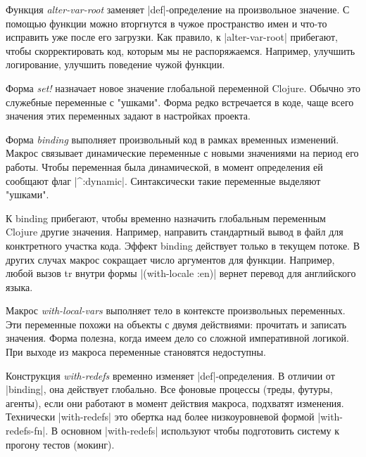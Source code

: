 Функция \emph{alter-var-root} заменяет \spverb|def|-определение на произвольное значение. С
помощью функции можно вторгнутся в чужое пространство имен и что-то исправить
уже после его загрузки. Как правило, к \spverb|alter-var-root| прибегают, чтобы
скорректировать код, которым мы не распоряжаемся. Например, улучшить
логирование, улучшить поведение чужой функции.

Форма \emph{set!} назначает новое значение глобальной переменной Clojure. Обычно
это служебные переменные с "ушками". Форма редко встречается в коде, чаще всего
значения этих переменных задают в настройках проекта.

Форма \emph{binding} выполняет произвольный код в рамках временных
изменений. Макрос связывает динамические переменные с новыми значениями на
период его работы. Чтобы переменная была динамической, в момент определения ей
сообщают флаг \spverb|^:dynamic|. Синтаксически такие переменные выделяют "ушками".

К binding прибегают, чтобы временно назначить глобальным переменным Clojure
другие значения. Например, направить стандартный вывод в файл для конктретного
участка кода. Эффект binding действует только в текущем потоке. В других случах
макрос сокращает число аргументов для функции. Например, любой вызов tr внутри
формы \spverb|(with-locale :en)| вернет перевод для английского языка.

Макрос \emph{with-local-vars} выполняет тело в контексте произвольных
переменных. Эти переменные похожи на объекты с двумя действиями: прочитать и
записать значения. Форма полезна, когда имеем дело со сложной императивной
логикой. При выходе из макроса переменные становятся недоступны.

Конструкция \emph{with-redefs} временно изменяет \spverb|def|-определения. В отличии от
\spverb|binding|, она действует глобально. Все фоновые процессы (треды, футуры,
агенты), если они работают в момент действия макроса, подхватят
изменения. Технически \spverb|with-redefs| это обертка над более низкоуровневой формой
\spverb|with-redefs-fn|. В основном \spverb|with-redefs| используют чтобы подготовить систему
к прогону тестов (мокинг).
